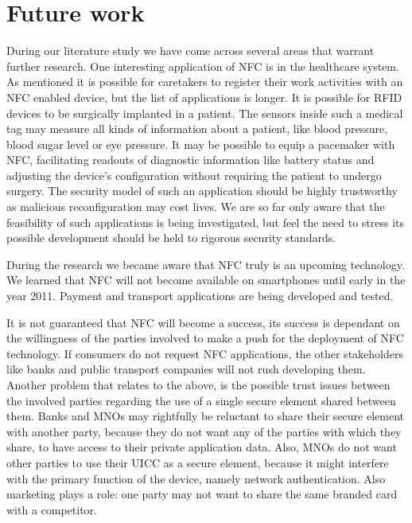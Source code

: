 \section{Future work}
\label{sec:future_work}

During our literature study we have come across several areas that warrant further research.
One interesting application of NFC is in the healthcare system.
As mentioned it is possible for caretakers to register their work activities with an NFC enabled device, but the list of applications is longer.
It is possible for RFID devices to be surgically implanted in a patient.
The sensors inside such a medical tag may measure all kinds of information about a patient, like blood pressure, blood sugar level or eye pressure.
It may be possible to equip a pacemaker with NFC, facilitating readouts of diagnostic information like battery status and adjusting the device's configuration without requiring the patient to undergo surgery. 
The security model of such an application should be highly trustworthy as malicious reconfiguration may cost lives.
We are so far only aware that the feasibility of such applications is being investigated, but feel the need to stress its possible development should be held to rigorous security standards.

During the research we became aware that NFC truly is an upcoming technology.
We learned that NFC will not become available on smartphones until early in the year 2011.
Payment and transport applications are being developed and tested.

It is not guaranteed that NFC will become a success, its success is dependant on the willingness of the parties involved to make a push for the deployment of NFC technology.
If consumers do not request NFC applications, the other stakeholders like banks and public transport companies will not rush developing them.
Another problem that relates to the above, is the possible trust issues between the involved parties regarding the use of a single secure element shared between them.
Banks and MNOs may rightfully be reluctant to share their secure element with another party, because they do not want any of the parties with which they share, to have access to their private application data.
Also, MNOs do not want other parties to use their UICC as a secure element, because it might interfere with the primary function of the device, namely network authentication.
Also marketing plays a role: one party may not want to share the same branded card with a competitor.

